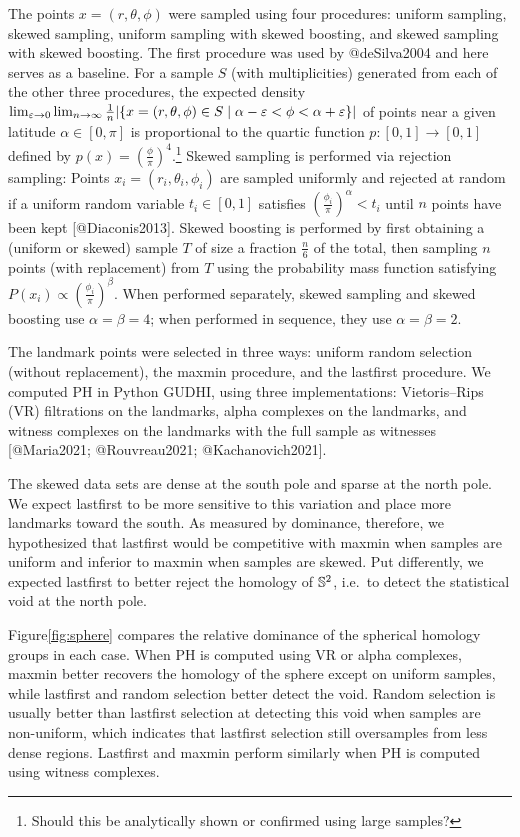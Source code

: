 \documentclass[
]{article}
\begin{document}
The points \(x=(r,\theta,\phi)\) were sampled using four procedures:
uniform sampling, skewed sampling, uniform sampling with skewed
boosting, and skewed sampling with skewed boosting. The first procedure
was used by @deSilva2004 and here serves as a baseline. For a sample
\(S\) (with multiplicities) generated from each of the other three
procedures, the expected density
\(\lim_{\varepsilon\to 0}\lim_{n\to\infty}\frac{1}{n}\lvert \{x=(r,\theta,\phi)\in S\mid \alpha-\varepsilon<\phi<\alpha+\varepsilon\}\rvert\)
of points near a given latitude \(\alpha\in[0,\pi]\) is proportional to
the quartic function \(p:[0,1]\to[0,1]\) defined by
\(p(x)=(\frac{\phi}{\pi})^4\).\footnote{Should this be analytically
  shown or confirmed using large samples?} Skewed sampling is performed
via rejection sampling: Points \(x_i=(r_i,\theta_i,\phi_i)\) are sampled
uniformly and rejected at random if a uniform random variable
\(t_i\in[0,1]\) satisfies \((\frac{\phi_i}{\pi})^\alpha<t_i\) until
\(n\) points have been kept {[}@Diaconis2013{]}. Skewed boosting is
performed by first obtaining a (uniform or skewed) sample \(T\) of size
a fraction \(\frac{n}{6}\) of the total, then sampling \(n\) points
(with replacement) from \(T\) using the probability mass function
satisfying \(P(x_i)\propto(\frac{\phi_i}{\pi})^\beta\). When performed
separately, skewed sampling and skewed boosting use \(\alpha=\beta=4\);
when performed in sequence, they use \(\alpha=\beta=2\).

The landmark points were selected in three ways: uniform random
selection (without replacement), the maxmin procedure, and the lastfirst
procedure. We computed PH in Python GUDHI, using three implementations:
Vietoris--Rips (VR) filtrations on the landmarks, alpha complexes on the
landmarks, and witness complexes on the landmarks with the full sample
as witnesses {[}@Maria2021; @Rouvreau2021; @Kachanovich2021{]}.

The skewed data sets are dense at the south pole and sparse at the north
pole. We expect lastfirst to be more sensitive to this variation and
place more landmarks toward the south. As measured by dominance,
therefore, we hypothesized that lastfirst would be competitive with
maxmin when samples are uniform and inferior to maxmin when samples are
skewed. Put differently, we expected lastfirst to better reject the
homology of \(\mathbb{S}^2\), i.e.~to detect the statistical void at the north
pole.

Figure\nbs\ref{fig:sphere} compares the relative dominance of the
spherical homology groups in each case. When PH is computed using VR or
alpha complexes, maxmin better recovers the homology of the sphere
except on uniform samples, while lastfirst and random selection better
detect the void. Random selection is usually better than lastfirst
selection at detecting this void when samples are non-uniform, which
indicates that lastfirst selection still oversamples from less dense
regions. Lastfirst and maxmin perform similarly when PH is computed
using witness complexes.
\end{document}
